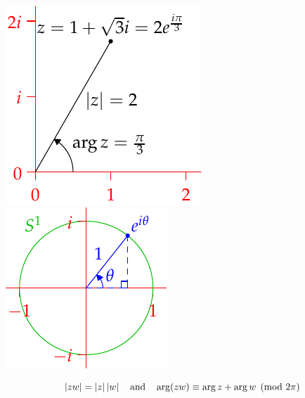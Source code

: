 \begin{aside}
\begin{minipage}[t]{0.7\textwidth}
	\end{minipage}
	\hfill
	\begin{minipage}[t]{0.29\textwidth}\vspace{-5pt}
		\flushright%
		\includegraphics[scale=0.9]{cyclic-polar}\\
		\includegraphics[scale=0.9]{cyclic-circle}
	\end{minipage}
	\par
	\[
		\left| zw\right|=\left| z\right|\left| w\right|\quad \text{and}\quad \arg(zw)\equiv \arg z+\arg w \pmod{2\pi}
	\]
\end{aside}


\goodbreak


